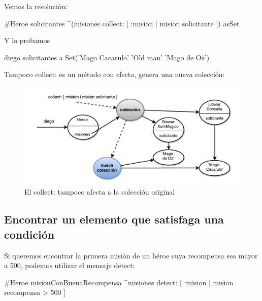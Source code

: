 \documentclass[a4paper,12pt]{book}
\begin{document}
Vemos la resolución:

\begin{code}
#Heroe
solicitantes
   ^(misiones collect: [ :mision | mision solicitante ]) asSet
\end{code}

Y lo probamos 

\begin{code}
diego solicitantes
   a Set('Mago Cacarulo' 'Old man' 'Mago de Oz')
\end{code}

Tampoco collect: es un método con efecto, genera una nueva colección:

\begin{figure}[h!]
    \centering
    \includegraphics[width=1.1\textwidth]{images/21_Collect_sin_efecto.pdf}
    \caption{El collect: tampoco afecta a la colección original}
\end{figure}

\subsection{Encontrar un elemento que satisfaga una condición}
Si queremos encontrar la primera misión de un héroe cuya recompensa sea mayor a 500, 
podemos utilizar el mensaje detect:

\begin{code}
#Heroe
misionConBuenaRecompensa
    ^misiones detect: [ :mision | mision recompensa > 500 ]
\end{code}
\end{document}
